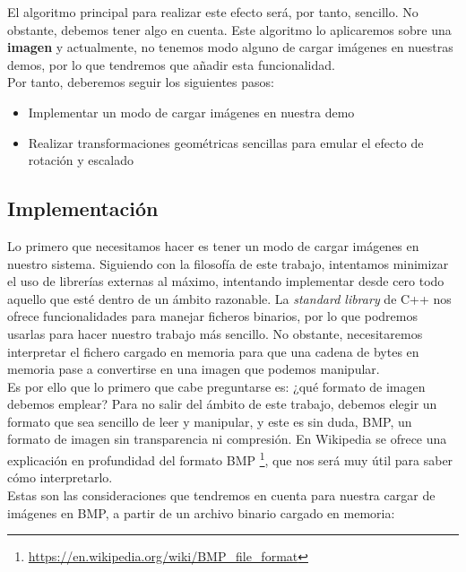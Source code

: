 El algoritmo principal para realizar este efecto será, por tanto, sencillo. No obstante, debemos tener algo en cuenta. Este algoritmo lo aplicaremos sobre una \textbf{imagen} y actualmente, no tenemos modo alguno de cargar imágenes en nuestras demos, por lo que tendremos que añadir esta funcionalidad.\\

Por tanto, deberemos seguir los siguientes pasos:
\begin{itemize}
	\item Implementar un modo de cargar imágenes en nuestra demo
	\item Realizar transformaciones geométricas sencillas para emular el efecto de rotación y escalado
\end{itemize}

\subsection{Implementación}

Lo primero que necesitamos hacer es tener un modo de cargar imágenes en nuestro sistema. Siguiendo con la filosofía de este trabajo, intentamos minimizar el uso de librerías externas al máximo, intentando implementar desde cero todo aquello que esté dentro de un ámbito razonable. La \emph{standard library} de C++ nos ofrece funcionalidades para manejar ficheros binarios, por lo que podremos usarlas para hacer nuestro trabajo más sencillo. No obstante, necesitaremos interpretar el fichero cargado en memoria para que una cadena de bytes en memoria pase a convertirse en una imagen que podemos manipular.\\

Es por ello que lo primero que cabe preguntarse es: ¿qué formato de imagen debemos emplear? Para no salir del ámbito de este trabajo, debemos elegir un formato que sea sencillo de leer y manipular, y este es sin duda, BMP, un formato de imagen sin transparencia ni compresión. En Wikipedia se ofrece una explicación en profundidad del formato BMP \footnote{\url{https://en.wikipedia.org/wiki/BMP_file_format}}, que nos será muy útil para saber cómo interpretarlo.\\

Estas son las consideraciones que tendremos en cuenta para nuestra cargar de imágenes en BMP, a partir de un archivo binario cargado en memoria:


